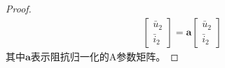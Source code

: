 \begin{tcbproof}
\begin{proof}
\begin{equation}
\begin{aligned}
                \begin{bmatrix}
                    \bar{u}_2\\
                    \bar{i}_2                
                \end{bmatrix}
                =\bm{a}
                \begin{bmatrix}
                    \bar{u}_2\\
                    \bar{i}_2                
                \end{bmatrix}
            \end{aligned}
        \end{equation}
        其中$\bm{a}$表示阻抗归一化的A参数矩阵。        
    \end{proof}\end{tcbproof}

